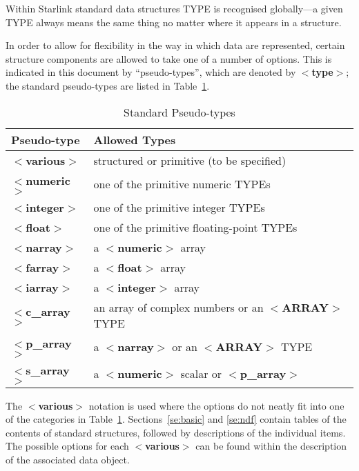 \documentclass[twoside,11pt]{article}
\newcommand{\htmlref}[2]{#1}
\newcommand{\html}[1]{}
\newcommand{\latex}[1]{#1}
\begin{document}
Within Starlink standard data structures TYPE is
recognised globally---a given TYPE always means the same thing no 
matter where it appears in a structure.

In order to allow for
flexibility in the way in which data are represented, certain structure
components are allowed to take one of a number of options. This is
indicated in this document by ``pseudo-types'',
which are denoted by $<${\bf type}$>$;
the standard pseudo-types are listed in Table~\ref{ta:pseudotypes}.

\begin{table}[htb]
\centering
\caption{Standard Pseudo-types}
\label{ta:pseudotypes}
\begin{tabular}[t]{|l|l|}
\hline
Pseudo-type & Allowed Types \\ \hline
$<${\bf various}$>$  & structured or primitive (to be specified) \\
$<${\bf numeric}$>$  & one of the primitive numeric TYPEs \\
$<${\bf integer}$>$  & one of the primitive integer TYPEs \\
$<${\bf float}$>$    & one of the primitive floating-point TYPEs \\
$<${\bf narray}$>$   & a $<${\bf numeric}$>$ array \\
$<${\bf farray}$>$   & a $<${\bf float}$>$ array \\
$<${\bf iarray}$>$   & a $<${\bf integer}$>$ array \\
$<${\bf c\_array}$>$ & an array of complex numbers or an $<${\bf ARRAY}$>$ TYPE \\
$<${\bf p\_array}$>$ & a $<${\bf narray}$>$ or an $<${\bf ARRAY}$>$ TYPE \\
$<${\bf s\_array}$>$ & a $<${\bf numeric}$>$ scalar or $<${\bf p\_array}$>$ \\ \hline
\end{tabular}
\end{table}

The $<${\bf various}$>$ notation is used where the options do not
neatly fit into one of the categories in Table~\ref{ta:pseudotypes}.
\latex{Sections~\ref{se:basic}}\html{\htmlref{Low-Level
Structures}{se:basic}} and \latex{\ref{se:ndf}}\html{\htmlref{The
Extensible n-dimensional Format}{se:ndf}} contain tables of the
contents of standard structures, followed by descriptions of the
individual items. The possible options for each $<${\bf various}$>$
can be found within the description of the associated data object.
\end{document}

